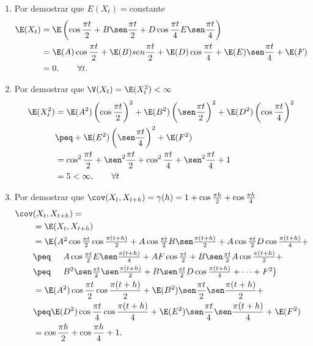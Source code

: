\begin{ejemplo}
\begin{enumerate}
	\begin{enumerate}
	\item Por demostrar que $E(X_{t} )=$constante
	\begin{align*}
	\E(X_{t} )& =\E\left( {\cos \frac{\pi t}{2}+B\sen\frac{\pi t}{2}+D\cos \frac{\pi t}{4}E\sen\frac{\pi t}{4}} \right)\\
		&=\E(A)\cos \frac{\pi t}{2}+\E(B)sen\frac{\pi t}{2}+\E(D)\cos \frac{\pi t}{4}+\E(E)\sen\frac{\pi t}{4}+\E(F)\\
		&=0, \qquad\forall t.
	\end{align*}

	\item Por demostrar que $\V(X_t)=\E(X_{t}^{2} )<\infty $
	\begin{align*}
	\E(X_{t}^{2} )&= \E(A^{2})\left(\cos \frac{\pi t}{2}\right)^{2}+\E(B^{2})\left(  \sen\frac{\pi t}{2} \right)^{2}+\E(D^{2})\left(\cos \frac{\pi t}{4}\right)^{2}\\
		&\peq+\E(E^{2})\left( \sen\frac{\pi t}{4} \right)^{2}+\E(F^{2})\\
		&=\cos^{2}\frac{\pi t}{2}+\sen^{2}\frac{\pi t}{2}+\cos^{2}\frac{\pi t}{4}+\sen^{2}\frac{\pi t}{4}+1\\
		&=5<\infty,\qquad \forall t
	\end{align*}

	\item Por demostrar que $\cov(X_{t}, X_{t+h} )=\gamma (h)=1+\cos \frac{\pi h}{2}+\cos \frac{\pi h}{4}$
	\begin{align*}
	\cov&(X_{t},X_{t+h})=\\
		&=\E(X_{t},X_{t+h} )\\
		& =\textstyle\E\big( A^{2}\cos \frac{\pi t}{2}\cos \frac{\pi (t+h)}{2}+A\cos \frac{\pi t}{2}B\sen\frac{\pi (t+h)}{2}+A\cos \frac{\pi t}{2}D\cos \frac{\pi (t+h)}{4}+\\
		&\peq\phantom{\E(}\textstyle A\cos \frac{\pi t}{2}E\sen\frac{\pi (t+h)}{4}+AF\cos \frac{\pi t}{2}+B\sen\frac{\pi t}{2}A\cos \frac{\pi (t+h)}{2}+\\
		&\peq\phantom{\E(}\textstyle B^{2}\sen\frac{\pi t}{2}\sen\frac{\pi (t+h)}{2}+B\sen\frac{\pi t}{2}D\cos \frac{\pi (t+h)}{4}+\cdots +F^{2}\big)\\
		&=\E(A^{2})\cos \frac{\pi t}{2}\cos \frac{\pi (t+h)}{2}+\E(B^{2})\sen\frac{\pi t}{2}\sen\frac{\pi (t+h)}{2}+\\
		& \peq \E(D^{2})\cos \frac{\pi t}{4}\cos \frac{\pi (t+h)}{4}+\E(E^{2})\sen\frac{\pi t}{4}\sen\frac{\pi (t+h)}{4}+\E(F^{2})\\
		& =\cos \frac{\pi h}{2}+\cos \frac{\pi h}{4}+1.
	\end{align*}
	\end{enumerate}
\end{enumerate}
\end{ejemplo}


